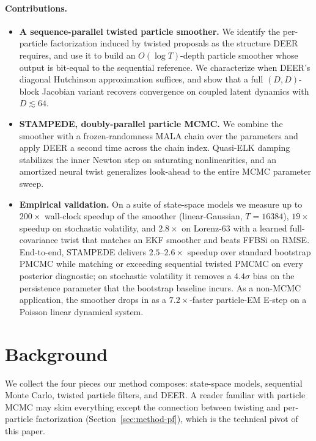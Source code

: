 \documentclass{article}
\begin{document}
\paragraph{Contributions.}
\begin{itemize}
    \setlength{\itemsep}{2pt}
    \item \textbf{A sequence-parallel twisted particle smoother.} We identify the per-particle factorization induced by twisted proposals as the structure DEER requires, and use it to build an $O(\log T)$-depth particle smoother whose output is bit-equal to the sequential reference. We characterize when DEER's diagonal Hutchinson approximation suffices, and show that a full $(D,D)$-block Jacobian variant recovers convergence on coupled latent dynamics with $D \!\lesssim\! 64$.
    \item \textbf{STAMPEDE, doubly-parallel particle MCMC.} We combine the smoother with a frozen-randomness MALA chain over the parameters and apply DEER a second time across the chain index. Quasi-ELK damping \citep{gonzalez2024towards} stabilizes the inner Newton step on saturating nonlinearities, and an amortized neural twist generalizes look-ahead to the entire MCMC parameter sweep.
    \item \textbf{Empirical validation.} On a suite of state-space models we measure up to $200\times$ wall-clock speedup of the smoother (linear-Gaussian, $T=16384$), $19\times$ speedup on stochastic volatility, and $2.8\times$ on Lorenz-63 with a learned full-covariance twist that matches an EKF smoother and beats FFBSi on RMSE. End-to-end, STAMPEDE delivers $2.5$--$2.6\times$ speedup over standard bootstrap PMCMC while matching or exceeding sequential twisted PMCMC on every posterior diagnostic; on stochastic volatility it removes a $4.4\sigma$ bias on the persistence parameter that the bootstrap baseline incurs. As a non-MCMC application, the smoother drops in as a $7.2\times$-faster particle-EM E-step on a Poisson linear dynamical system.
\end{itemize}

\section{Background}
\label{sec:background}

We collect the four pieces our method composes: state-space models, sequential Monte Carlo, twisted particle filters, and DEER. A reader familiar with particle MCMC may skim everything except the connection between twisting and per-particle factorization (Section~\ref{sec:method-pf}), which is the technical pivot of this paper.
\end{document}
